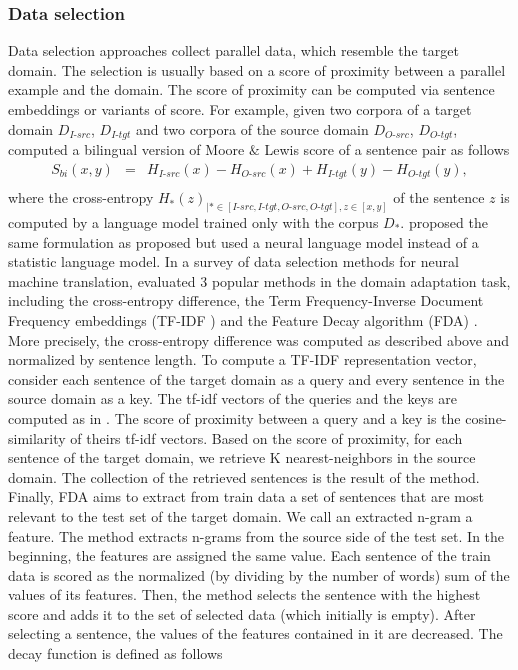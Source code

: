 \subsubsection{Data selection}
Data selection approaches collect parallel data, which resemble the target domain. The selection is usually based on a score of proximity between a parallel example and the domain. The score of proximity can be computed via sentence embeddings or variants of \citet{Moore10intelligent} score. For example, given two corpora of a target domain $D_{I\text{-}src}$, $D_{I\text{-}tgt}$ and two corpora of the source domain $D_{O\text{-}src}$, $D_{O\text{-}tgt}$, \citet{Axelrod11domain} computed a bilingual version of Moore $\&$ Lewis score of a sentence pair as follows
\begin{equation}
\begin{array}{rcl}
S_{bi} (x,y) &=& H_{I\text{-}src}(x) - H_{O\text{-}src}(x) + H_{I\text{-}tgt}(y) - H_{O\text{-}tgt}(y), \\
\end{array}
\label{eq:ced}
\end{equation}
where the cross-entropy $H_{*}(z)_{| * \in [I\text{-}src, I\text{-}tgt, O\text{-}src, O\text{-}tgt], z \in [x,y]}$ of the sentence $z$ is computed by a language model trained only with the corpus $D_{*}$. \citet{Duh13adaptation} proposed the same formulation as proposed \citet{Axelrod11domain} but used a neural language model instead of a statistic language model. In a survey of data selection methods for neural machine translation, \citet{Silva18extracting} evaluated 3 popular methods in the domain adaptation task, including the cross-entropy difference, the Term Frequency-Inverse Document Frequency embeddings (TF-IDF ) \citep{Salton73On} and the Feature Decay algorithm (FDA) \citep{Poncelas18Feature}. More precisely, the cross-entropy difference was computed as described above and normalized by sentence length. To compute a TF-IDF representation vector, \citet{Silva18extracting} consider each sentence of the target domain as a query and every sentence in the source domain as a key. The tf-idf vectors of the queries and the keys are computed as in \citet{Salton73On}. The score of proximity between a query and a key is the cosine-similarity of theirs tf-idf vectors. Based on the score of proximity, for each sentence of the target domain, we retrieve K nearest-neighbors in the source domain. The collection of the retrieved sentences is the result of the method. Finally, FDA aims to extract from train data a set of sentences that are most relevant to the test set of the target domain. We call an extracted n-gram a feature. The method extracts n-grams from the source side of the test set. In the beginning, the features are assigned the same value. Each sentence of the train data is scored as the normalized (by dividing by the number of words) sum of the values of its features. Then, the method selects the sentence with the highest score and adds it to the set of selected data (which initially is empty). After selecting a sentence, the values of the features contained in it are decreased. The decay function is defined as follows
